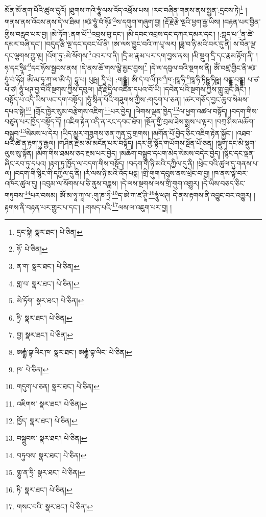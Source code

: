 མོན་མོ་ནག་པོའི་ཚུལ་དུའོ། །ཐུགས་ཀའི་ཧཱུཾ་ལས་འོད་འཕྲོས་པས། །རང་བཞིན་གནས་ནས་སྤྱན་:དྲངས་ཏེ།\footnote{དྲང་སྟེ།  སྣར་ཐང་།  པེ་ཅིན། } །གནས་ནས་འོངས་ནས་དེ་ལ་ཐིམ། །ཛཿ་ཧཱུཾ་བཾ་ཧོཿ་\footnote{ཧོ་  པེ་ཅིན། }ས་དགུག་གཞུག་བྱ། །རྡོ་རྗེ་རྩེ་ལྔའི་ཕྱག་རྒྱ་ཡིས། །བརྟན་པར་བྱིན་གྱིས་བརླབ་པར་བྱ། །མེ་ཏོག་:ནག་པོ་\footnote{ན་ག་  སྣར་ཐང་།  པེ་ཅིན། }འབྲས་བུ་དང་། །མི་དབང་འབྲས་དང་དཀར་དམར་དང་། །:ཀླད་པ་\footnote{གླ་བ་  སྣར་ཐང་།  པེ་ཅིན། }ན་ཚེ་དམར་བཞི་དང་། །བདུད་རྩི་ལྔ་དང་དབང་པོ་ནི། །ཨ་ལས་བྱུང་བའི་ཀ་པཱ་ལར། །ཟླ་བ་ཉི་མའི་བར་དུ་ནི། ས་བོན་ལྔ་དང་ལྕགས་ཀྱུ་ལྔ། །འོག་ཏུ་:མེ་སོགས་\footnote{མེ་ཏོག་  སྣར་ཐང་།  པེ་ཅིན། }འབར་བ་ནི། །དྲི་མ་རྣམ་པར་དག་བྱས་ནས། །མི་སྡུག་དྲི་དང་རྣམ་རྟོག་ནི། །ཧ་དང་ཧྲཱིཿ་\footnote{ཧྲི་  སྣར་ཐང་།  པེ་ཅིན། }དང་ཧོས་སྦྱངས་ནས། །དེ་ནས་ཆོ་གས་ལྕེ་མྱང་བྱས།\footnote{བྱ།  སྣར་ཐང་།  པེ་ཅིན། } །དེ་ལ་དབུལ་བའི་སྔགས་ནི། ཨོཾ་བཛྲ་གྱིང་ནི་ཛཿ་ཧཱུཾ་བཾ་ཧོཿ། ཨོཾ་མ་ཧཱ་ཀཱ་ལ་ཨི་དཾ། དྷཱུ་པ། པུཥྤ། དཱི་པཾ། :གནྡྷཾ། ཨི་དཾ་བ་ལིཾ་ཁ་\footnote{ཨརྒྷཾ་བྷ་ལིང་ཁ་  སྣར་ཐང་། ཨརྒྷཾ་བྷ་ལིང་  པེ་ཅིན། }ཁ་:ཁཱ་ཧི་\footnote{ཁ་  པེ་ཅིན། }ཁཱ་ཧི་ཏིཥྛ་ཏིཥྛ། བནྡྷ་བནྡྷ། པ་ཙ་པ་ཙ། ཧཱུཾ་ཕཊ་བྱ་བའི་སྔགས་ཀྱིས་དབུལ། །རྡོ་རྗེ་དྲིལ་འཛིན་དཔའ་བོ་ཡི། །དབེན་པའི་སྔགས་ཀྱིས་གླུ་བླང་ཞིང་། །བསྟོད་པ་འདི་ཡིས་ཡང་དག་བསྟོད། །ཧཱུཾ་སྲིན་པོའི་གཟུགས་ཀྱིས་:གདུག་པ་ཅན། །ཚར་གཅོད་བྱང་ཆུབ་སེམས་དཔའ་སྟེ།\footnote{གདུག་པ་ཅན།  སྣར་ཐང་།  པེ་ཅིན། } །གྲོང་ཁྱེར་སུམ་བརྩེགས་འཇིག་\footnote{འཇིགས་  སྣར་ཐང་།  པེ་ཅིན། }པར་བྱེད། །ལེགས་ལྡན་ཁྱེད་\footnote{ཁྱོད་  སྣར་ཐང་།  པེ་ཅིན། }ལ་ཕྱག་འཚལ་བསྟོད། །བདག་གིས་བཙུན་པར་ཁྱོད་བསྟོད་དོ། །འཇིག་རྟེན་འདི་ན་རང་དབང་ཐོབ། །སྔོན་གྱི་བྲམ་ཟེས་སྨྲས་པ་ལྟར། །བཀྲ་ཤིས་མཆོག་བསྒྲུབ་\footnote{བསྒྲུབས་  སྣར་ཐང་།  པེ་ཅིན། }སེམས་པ་དེར། །ཡིད་མྱུར་གཟུགས་ཅན་ཀུན་དུ་གྲགས། །མགོན་པོ་བྱེད་ཅིང་འཇིག་རྟེན་སྐྱོང་། །འཐབ་པའི་ཚེ་ན་རྟག་ཏུ་རྒྱལ། །གཤིན་རྗེ་མ་མོ་མངོན་པར་བསྟོད། །དར་གྱི་སྟོད་གཡོགས་སྔོན་པོ་ཅན། །སྡུག་དང་མི་སྡུག་ལུས་སུ་སྟོན། །མིག་གིས་ཐམས་ཅད་རྔམ་པར་བྱེད། །མཆོག་བསྒྲུབ་དཔག་མེད་སེམས་བདེར་བྱེད། །སྙིང་དང་ལྡན་ཞིང་རབ་ཏུ་དཔའ། །རྟག་ཏུ་ཁྱོད་ལ་བདག་གིས་བསྟོད། །བདག་གི་ཉི་མའི་དཀྱིལ་དུ་ནི། །ཕྲེང་བའི་ཚུལ་དུ་གནས་པ་ལ། །བདག་གི་སྙིང་གི་དཀྱིལ་དུ་ནི། །རཾ་ལས་ཉི་མའི་འོད་པདྨ། །གྲི་གུག་དབུས་ནས་ཕྲེང་བ་བྱ། །ཁ་ནས་ལྟེ་བར་འཁོར་ཚུལ་དུ། །འབུམ་ལ་སོགས་པ་ཅི་ནུས་བཟླས། །དེ་ལས་སྔགས་ལས་གྲི་གུག་འགྱུར། །དེ་ཡིས་བཅད་ཅིང་གཏུབས་\footnote{བཏུབས་  སྣར་ཐང་།  པེ་ཅིན། }པར་བསམ། ཨོཾ་མ་ཧཱ་ཀཱ་ལ་:གུ་ཎ་ཧྲྀ་\footnote{གྷུ་ན་ཧྲི་  སྣར་ཐང་།  པེ་ཅིན། }ད་ཨེ་ཀ་ཛ་ཊཱི་\footnote{ཏི་  སྣར་ཐང་།  པེ་ཅིན། }ཧཱུཾ་ཕཊ། དེ་ནས་རྟགས་ནི་འབྱུང་བར་འགྱུར། །རྟགས་ནི་བརྟན་པར་གྱུར་པ་དང་། །:གསད་པའི་\footnote{གསང་བའི་  སྣར་ཐང་།  པེ་ཅིན། }ལས་ལ་འཇུག་པར་བྱ། །
